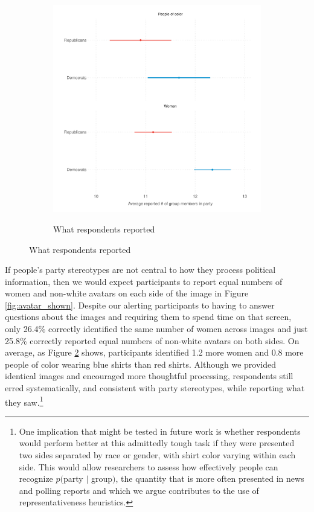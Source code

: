 \documentclass[12pt, letterpaper]{article}
\begin{document}
\begin{figure}
\ContinuedFloat
\begin{subfigure}[t]{1\textwidth}
	\caption{What respondents reported}
	\includegraphics[width=1\textwidth]{../figs/avatar_results.pdf} \label{fig:avatar_guessed}
\end{subfigure}
\end{figure}

If people's party stereotypes are not central to how they process political information, then we would expect participants to report equal numbers of women and non-white avatars on each side of the image in Figure \ref{fig:avatar_shown}. Despite our alerting participants to having to answer questions about the images and requiring them to spend time on that screen, only 26.4\% correctly identified the same number of women across images and just 25.8\% correctly reported equal numbers of non-white avatars on both sides. On average, as Figure \ref{fig:avatar_guessed} shows, participants identified 1.2 more women and 0.8 more people of color wearing blue shirts than red shirts. Although we provided identical images and encouraged more thoughtful processing, respondents still erred systematically, and consistent with party stereotypes, while reporting what they saw.\footnote{One implication that might be tested in future work is whether respondents would perform better at this admittedly tough task if they were presented two sides separated by race or gender, with shirt color varying within each side. This would allow researchers to assess how effectively people can recognize $p($party $|$ group$)$, the quantity that is more often presented in news and polling reports and which we argue contributes to the use of representativeness heuristics.}
\end{document}
